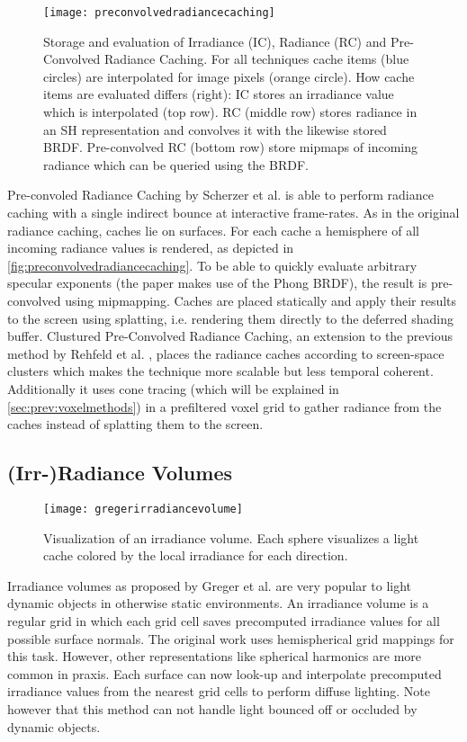 \documentclass[thesis.tex]{subfiles}
\begin{document}
\begin{figure}[h]
	\centering
	\texttt{[image: preconvolvedradiancecaching]}
	\caption{\cite{bib:preconvoledradiancecaching} Storage and evaluation of Irradiance (IC), Radiance (RC) and Pre-Convolved Radiance Caching. For all techniques cache items (blue circles) are interpolated for image pixels (orange circle).
	How cache items are evaluated differs (right):
	IC stores an irradiance value which is interpolated (top row). RC (middle row) stores radiance in an SH representation and convolves it with the likewise stored BRDF.
	Pre-convolved RC (bottom row) store mipmaps of incoming radiance which can be queried using the BRDF.} \label{fig:preconvolvedradiancecaching}
\end{figure}
Pre-convoled Radiance Caching by Scherzer et al. \cite{bib:preconvoledradiancecaching} is able to perform radiance caching with a single indirect bounce at interactive frame-rates.
As in the original radiance caching, caches lie on surfaces.
For each cache a hemisphere of all incoming radiance values is rendered, as depicted in \autoref{fig:preconvolvedradiancecaching}.
To be able to quickly evaluate arbitrary specular exponents (the paper makes use of the Phong BRDF), the result is pre-convolved using mipmapping.
Caches are placed statically and apply their results to the screen using splatting, i.e. rendering them directly to the deferred shading buffer.
Clustured Pre-Convolved Radiance Caching, an extension to the previous method by Rehfeld et al. \cite{bib:clusteredpreconvoledradiancecaching}, places the radiance caches according to screen-space clusters which makes the technique more scalable but less temporal coherent.
Additionally it uses cone tracing (which will be explained in \autoref{sec:prev:voxelmethods}) in a prefiltered voxel grid to gather radiance from the caches instead of splatting them to the screen.

\subsection{(Irr-)Radiance Volumes}

\begin{figure}[h]
	\centering
	\texttt{[image: gregerirradiancevolume]}
	\caption{\cite{bib:irradiancevolume} Visualization of an irradiance volume. Each sphere visualizes a light cache colored by the local irradiance for each direction. } \label{fig:irradiancevolume}
\end{figure}
Irradiance volumes as proposed by Greger et al. \cite{bib:irradiancevolume} are very popular to light dynamic objects in otherwise static environments.
An irradiance volume is a regular grid in which each grid cell saves precomputed irradiance values for all possible surface normals.
The original work uses hemispherical grid mappings for this task.
However, other representations like spherical harmonics are more common in praxis.
Each surface can now look-up and interpolate precomputed irradiance values from the nearest grid cells to perform diffuse lighting. 
Note however that this method can not handle light bounced off or occluded by dynamic objects.
\end{document}
